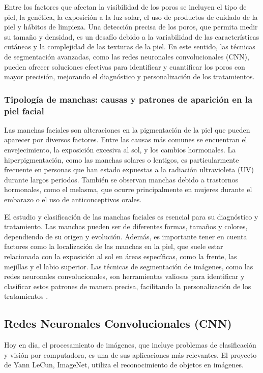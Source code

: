 Entre los factores que afectan la visibilidad de los poros se incluyen el tipo de piel, la genética, la exposición a la luz solar, el uso de productos de cuidado de la piel y hábitos de limpieza. Una detección precisa de los poros, que permita medir su tamaño y densidad, es un desafío debido a la variabilidad de las características cutáneas y la complejidad de las texturas de la piel. En este sentido, las técnicas de segmentación avanzadas, como las redes neuronales convolucionales (CNN), pueden ofrecer soluciones efectivas para identificar y cuantificar los poros con mayor precisión, mejorando el diagnóstico y personalización de los tratamientos. \parencite{cameron2021}

\subsubsection{Tipología de manchas: causas y patrones de aparición en la piel facial}
Las manchas faciales son alteraciones en la pigmentación de la piel que pueden aparecer por diversos factores. Entre las causas más comunes se encuentran el envejecimiento, la exposición excesiva al sol, y los cambios hormonales. La hiperpigmentación, como las manchas solares o lentigos, es particularmente frecuente en personas que han estado expuestas a la radiación ultravioleta (UV) durante largos periodos. También se observan manchas debido a trastornos hormonales, como el melasma, que ocurre principalmente en mujeres durante el embarazo o el uso de anticonceptivos orales.

El estudio y clasificación de las manchas faciales es esencial para su diagnóstico y tratamiento. Las manchas pueden ser de diferentes formas, tamaños y colores, dependiendo de su origen y evolución. Además, es importante tener en cuenta factores como la localización de las manchas en la piel, que suele estar relacionada con la exposición al sol en áreas específicas, como la frente, las mejillas y el labio superior. Las técnicas de segmentación de imágenes, como las redes neuronales convolucionales, son herramientas valiosas para identificar y clasificar estos patrones de manera precisa, facilitando la personalización de los tratamientos \parencite{zouboulis2014}.

\subsection{Redes Neuronales Convolucionales (CNN)}

Hoy en día, el procesamiento de imágenes, que incluye problemas de clasificación y visión por computadora, es una de sus aplicaciones más relevantes. El proyecto de Yann LeCun, ImageNet, utiliza el reconocimiento de objetos en imágenes.
	
